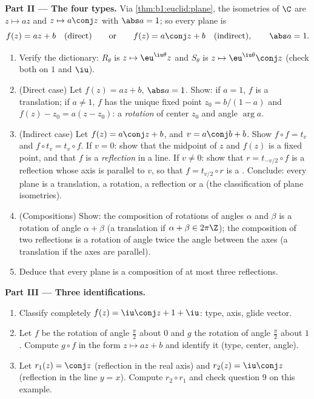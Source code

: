\begin{problem}
\medskip
\noindent\textbf{Part II --- The four types.} Via
\cref{thm:b1:euclid:plane}, the  isometries of $\C$ are $z
\mapsto az$ and $z \mapsto a\conj z$ with $\abs a = 1$; so every
plane  is
\[
f(z) = a z + b \quad (\text{direct}) \qquad\text{or}\qquad
f(z) = a\conj z + b \quad (\text{indirect}), \qquad \abs a = 1 .
\]
\begin{enumerate}[resume]
  \item Verify the dictionary: $R_\theta$ is $z \mapsto
        \eu^{\iu\theta}z$ and $S_\theta$ is $z \mapsto
        \eu^{\iu\theta}\conj z$ (check both on $1$ and $\iu$).
  \item (Direct case) Let $f(z) = az + b$, $\abs a = 1$. Show:
        if $a = 1$, $f$ is a translation; if $a \neq 1$, $f$ has
        the unique fixed point $z_0 = b/(1 - a)$ and $f(z) - z_0
        = a(z - z_0)$: a \emph{rotation} of center $z_0$ and
        angle $\arg a$.
  \item (Indirect case) Let $f(z) = a\conj z + b$, and $v =
        a\conj b + b$. Show $f \circ f = t_v$ and $f \circ t_v =
        t_v \circ f$. If $v = 0$: show that the midpoint of $z$
        and $f(z)$ is a fixed point, and that $f$ is a
        \emph{reflection} in a line. If $v \neq 0$: show that $r
        = t_{-v/2}\circ f$ is a reflection whose axis is
        parallel to $v$, so that $f = t_{v/2} \circ r$ is a
        \emph{}. Conclude: every plane 
        is a translation, a rotation, a reflection or a  (the classification of plane isometries).
  \item (Compositions) Show: the composition of rotations of
        angles $\alpha$ and $\beta$ is a rotation of angle
        $\alpha + \beta$ (a translation if $\alpha + \beta \in
        2\pi\Z$); the composition of two reflections is a
        rotation of angle twice the angle between the axes (a
        translation if the axes are parallel).
  \item Deduce that every plane  is a composition of at
        most three reflections.
\end{enumerate}

\medskip
\noindent\textbf{Part III --- Three identifications.}
\begin{enumerate}[resume]
  \item Classify completely $f(z) = \iu\conj z + 1 + \iu$:
        type, axis, glide vector.
  \item Let $f$ be the rotation of angle $\frac\pi2$ about $0$
        and $g$ the rotation of angle $\frac\pi2$ about $1$.
        Compute $g \circ f$ in the form $z \mapsto az + b$ and
        identify it (type, center, angle).
  \item Let $r_1(z) = \conj z$ (reflection in the real axis) and
        $r_2(z) = \iu\conj z$ (reflection in the line $y = x$).
        Compute $r_2 \circ r_1$ and check question 9 on this
        example.
\end{enumerate}


\end{problem}
